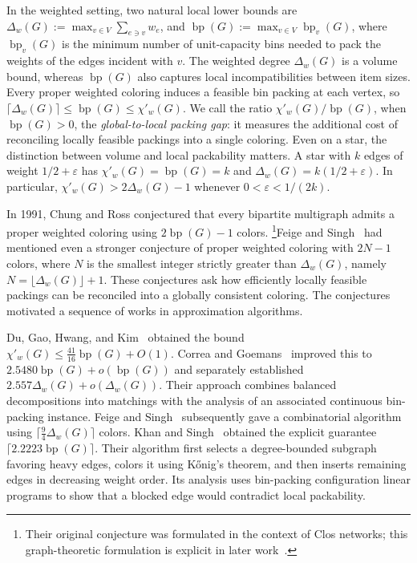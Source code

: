 \documentclass[11pt]{article}
\theoremstyle{definition}\newtheorem{algorithm}{Algorithm}[section]
\numberwithin{equation}{section}
\theoremstyle{remark}\newtheorem*{remark}{Remark}
\newcommand{\bp}{\operatorname{bp}}
\newcommand{\eps}{\varepsilon}
\newcommand{\dw}{\Delta_w}
\newcommand{\cw}{\chi'_w}
\begin{document}
In the weighted setting, two natural local lower bounds are
$\dw(G):=\max_{v\in V}\sum_{e\ni v}w_e$, and $\bp(G):=\max_{v\in V}\bp_v(G)$,
where $\bp_v(G)$ is the minimum number of unit-capacity bins needed to pack
the weights of the edges incident with $v$. The weighted degree $\dw(G)$
is a volume bound, whereas $\bp(G)$ also captures local incompatibilities
between item sizes. Every proper weighted coloring induces a feasible
bin packing at each vertex, so
$\lceil\dw(G)\rceil\le\bp(G)\le\cw(G)$.
We call the ratio $\cw(G)/\bp(G)$, when $\bp(G)>0$, the
\emph{global-to-local packing gap}: it measures the additional cost of
reconciling locally feasible packings into a single coloring. Even on a
star, the distinction between volume and local packability matters.
A star with $k$ edges of weight $1/2+\eps$ has $\cw(G)=\bp(G)=k$ and
$\dw(G)=k(1/2+\eps)$. In particular, $\cw(G)>2\dw(G)-1$ whenever
$0<\eps<1/(2k)$.



In 1991, Chung and Ross \cite{CR91} conjectured that 
every  bipartite
multigraph admits a proper weighted coloring
 using $2 \bp(G) -1$ colors. 
 \footnote{Their original conjecture was formulated
in the context of Clos networks; this graph-theoretic formulation is
explicit in later work~\cite{FS,KS15}.}Feige and Singh~\cite{FS} had mentioned even a stronger conjecture of proper weighted coloring with $2N-1$ colors, where $N$ is the smallest integer strictly greater
than $\dw(G)$, namely $N=\lfloor\dw(G)\rfloor+1$.
These conjectures ask how efficiently locally feasible
packings can be reconciled into a globally consistent coloring. 
The conjectures motivated a sequence of works in approximation algorithms. 

Du, Gao, Hwang, and Kim~\cite{DGHK98} obtained the bound
$\cw(G) \le \frac{41}{16}\bp(G)+O(1)$. Correa and Goemans~\cite{CG07} improved this to $2.5480\bp(G)+o(\bp(G))$ and separately established
$2.557\dw(G)+o(\dw(G))$. Their approach combines balanced decompositions into matchings with the analysis of an associated continuous bin-packing instance. Feige and Singh~\cite{FS} subsequently gave a combinatorial algorithm using $\lceil\frac94\dw(G)\rceil$ colors. Khan and Singh~\cite{KS15} obtained the explicit guarantee $\lceil2.2223\bp(G)\rceil$. Their algorithm first selects a degree-bounded subgraph favoring heavy edges, colors it using K\H{o}nig's theorem, and then
inserts remaining edges in decreasing weight order. Its analysis uses bin-packing configuration linear programs to show that a blocked edge would contradict local packability. 
\end{document}
